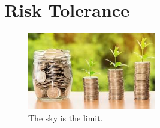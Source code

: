 
\section{Risk Tolerance}

\begin{figure}[!h]
\centering
\includegraphics[width=0.5\textwidth]{titlepage.jpeg}
\caption*{The sky is the limit.}
\end{figure}



\newpage